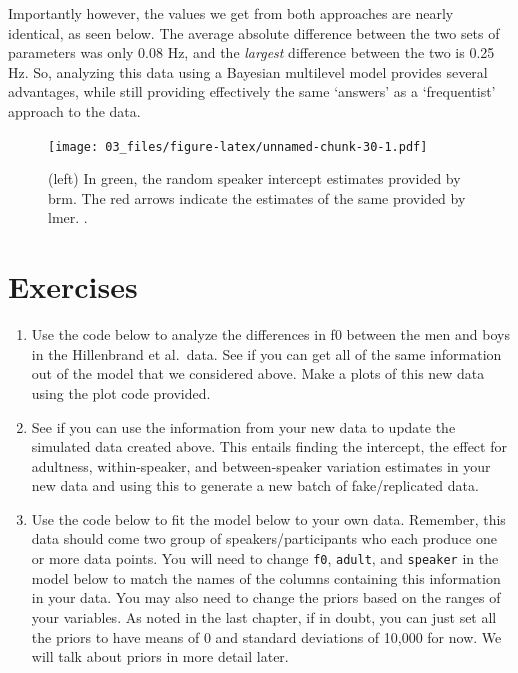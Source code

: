\documentclass[
]{book}
\begin{document}
Importantly however, the values we get from both approaches are nearly identical, as seen below. The average absolute difference between the two sets of parameters was only 0.08 Hz, and the \emph{largest} difference between the two is 0.25 Hz. So, analyzing this data using a Bayesian multilevel model provides several advantages, while still providing effectively the same `answers' as a `frequentist' approach to the data.

\begin{figure}
\centering
\texttt{[image: 03\_files/figure-latex/unnamed-chunk-30-1.pdf]}
\caption{\label{fig:unnamed-chunk-30} (left) In green, the random speaker intercept estimates provided by brm. The red arrows indicate the estimates of the same provided by lmer. .}
\end{figure}

\hypertarget{exercises-2}{%
\section{Exercises}\label{exercises-2}}

\begin{enumerate}
\def\labelenumi{\arabic{enumi})}
\item
  Use the code below to analyze the differences in f0 between the men and boys in the Hillenbrand et al.~data. See if you can get all of the same information out of the model that we considered above. Make a plots of this new data using the plot code provided.
\item
  See if you can use the information from your new data to update the simulated data created above. This entails finding the intercept, the effect for adultness, within-speaker, and between-speaker variation estimates in your new data and using this to generate a new batch of fake/replicated data.
\item
  Use the code below to fit the model below to your own data. Remember, this data should come two group of speakers/participants who each produce one or more data points. You will need to change \texttt{f0}, \texttt{adult}, and \texttt{speaker} in the model below to match the names of the columns containing this information in your data. You may also need to change the priors based on the ranges of your variables. As noted in the last chapter, if in doubt, you can just set all the priors to have means of 0 and standard deviations of 10,000 for now. We will talk about priors in more detail later.
\end{enumerate}
\end{document}

